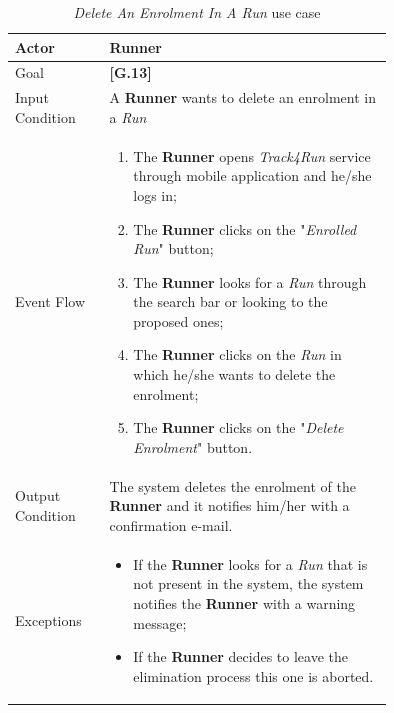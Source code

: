 \begin{center}
\begin{table}
\begin{tabular}{ | l | p{0.75\linewidth} | }
  \hline
    Actor & \textbf{Runner} \\ \hline
    Goal & \textbf{[G.13]} \\ \hline
    Input Condition & A \textbf{Runner} wants to delete an enrolment in a \textit{Run} \\ \hline
    Event Flow & \begin{minipage}[t]{0.7\textwidth}
      \begin{enumerate}
        \item The \textbf{Runner} opens \textit{Track4Run} service through mobile application and he/she logs in;
        \item The \textbf{Runner} clicks on the "\textit{Enrolled Run}" button;
        \item The \textbf{Runner} looks for a \textit{Run} through the search bar or looking to the proposed ones;
        \item The \textbf{Runner} clicks on the \textit{Run} in which he/she wants to delete the enrolment;
        \item The \textbf{Runner} clicks on the "\textit{Delete Enrolment}" button.
      \end{enumerate}
    \smallskip
  \end{minipage} \\ \hline
  Output Condition & The system deletes the enrolment of the \textbf{Runner} and it notifies him/her with a confirmation e-mail. \\ \hline
  Exceptions & \begin{minipage}[t]{0.7\textwidth}
    \begin{itemize}
      \smallskip
      \item If the \textbf{Runner} looks for a \textit{Run} that is not present in the system, the system notifies the \textbf{Runner} with a warning message;
      \item If the \textbf{Runner} decides to leave the elimination process this one is aborted.
    \end{itemize}
    \smallskip
  \end{minipage}  \\ \hline
\end{tabular}
\caption{\textit{Delete An Enrolment In A Run} use case}
\label{table:deleteEnrolmentTable}
\end{table}
\end{center}

